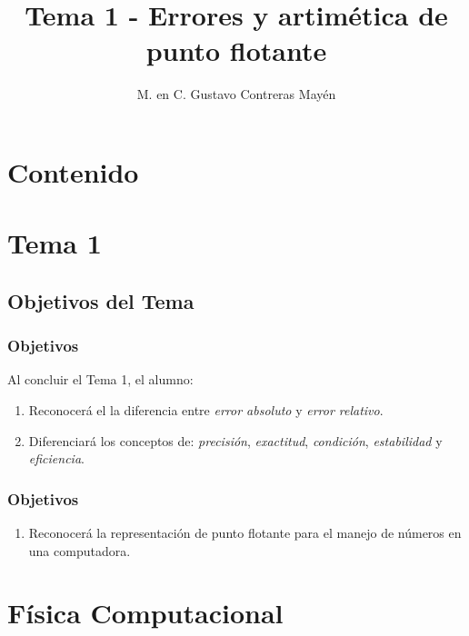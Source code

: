 \documentclass[12pt]{beamer}
\title{\large{Tema 1 - Errores y artimética de punto flotante}}
\author{M. en C. Gustavo Contreras Mayén}
\date{ }
\begin{document}
\maketitle

\section*{Contenido}

\section{Tema 1}
\subsection{Objetivos del Tema}

\begin{frame}
\frametitle{Objetivos}
Al concluir el Tema 1, el alumno:
\begin{enumerate}[<+->]
\item Reconocerá el la diferencia entre \textit{error absoluto} y \textit{error relativo}.
\item Diferenciará los conceptos de: \textit{precisión}, \textit{exactitud}, \textit{condición}, \textit{estabilidad} y \textit{eficiencia}.
\seti
\end{enumerate}
\end{frame}
\begin{frame}
\frametitle{Objetivos}
\begin{enumerate}[<+->]
\conti
\item Reconocerá la representación de punto flotante para el manejo de números en una computadora.
\end{enumerate}
\end{frame}

\section{Física Computacional}
\end{document}
